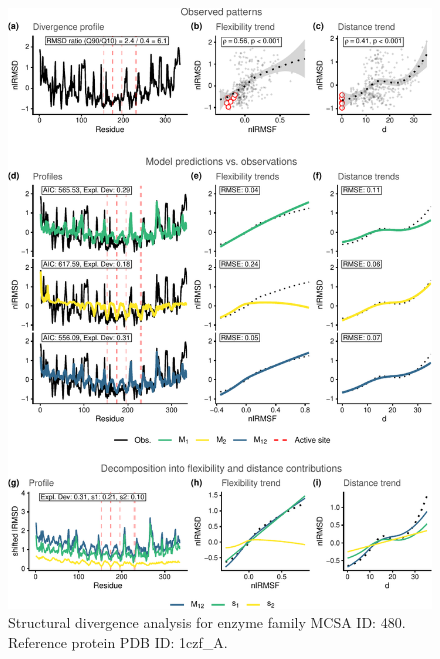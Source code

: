 \documentclass[
]{article}
\begin{document}
\clearpage
\begin{figure}[H]
\centering


\begin{center}\includegraphics{supplementary_material_files/figure-latex/generate_figures-24} \end{center}

\caption{Structural divergence analysis for enzyme family MCSA ID: 480. Reference protein PDB ID: 1czf\_A.}
\end{figure}
\end{document}
